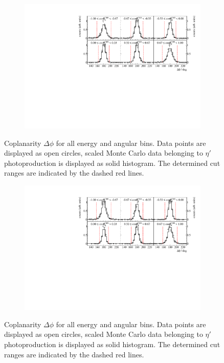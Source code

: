 \begin{figure}[H]
	\begin{subfigure}{\linewidth}
		\includegraphics[width=\linewidth]{../figs/hydrogen/bin_cuts/phicut_ebin2.pdf}
	\end{subfigure}
\caption{Coplanarity $\Delta\phi$ for all energy and angular bins. Data points are displayed as open circles, scaled Monte Carlo data belonging to $\eta'$ photoproduction is displayed as solid histogram. The determined cut ranges are indicated by the dashed red lines.}
\end{figure}
\begin{figure}[H]
\ContinuedFloat
	\begin{subfigure}{\linewidth}
		\includegraphics[width=\linewidth]{../figs/hydrogen/bin_cuts/phicut_ebin3.pdf}
	\end{subfigure}
\caption{Coplanarity $\Delta\phi$ for all energy and angular bins. Data points are displayed as open circles, scaled Monte Carlo data belonging to $\eta'$ photoproduction is displayed as solid histogram. The determined cut ranges are indicated by the dashed red lines.}
\label{fig:appcopl}	
\end{figure}
